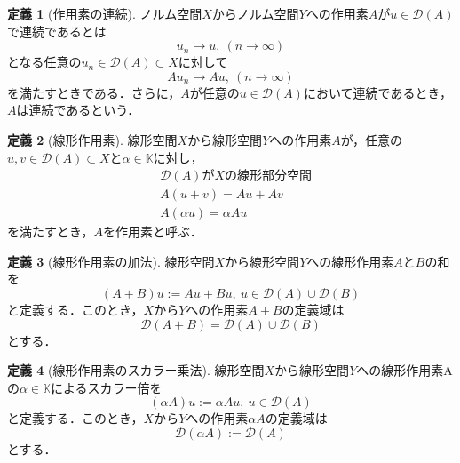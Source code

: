 \documentclass[11pt,a4paper,titlepage]{jsreport}
\theoremstyle{definition}
\newtheorem{dfn}{定義}
\begin{document}
\begin{dfn}[作用素の連続]
  ノルム空間$X$からノルム空間$Y$への作用素$A$が$u\in\mathcal{D}(A)$で連続であるとは
  \begin{equation*}
    u_n \rightarrow u, \ (n\rightarrow \infty)
  \end{equation*}
  となる任意の$u_n\in\mathcal{D}(A)\subset X$に対して
  \begin{equation*}
    Au_n\rightarrow Au, \ (n\rightarrow \infty)
  \end{equation*}
  を満たすときである．さらに，$A$が任意の$u\in\mathcal{D}(A)$において連続であるとき，$A$は連続であるという．
\end{dfn}

\begin{dfn}[線形作用素]
  線形空間$X$から線形空間$Y$への作用素$A$が，任意の$u,v\in\mathcal{D}(A)\subset X$と$\alpha\in\mathbb{K}$に対し，
  \begin{align*}
     & \mathcal{D}(A)がXの線形部分空間 \\
     & A(u+v)=Au+Av                    \\
     & A(\alpha u)=\alpha Au
  \end{align*}
  を満たすとき，$A$を作用素と呼ぶ．
\end{dfn}

\begin{dfn}[線形作用素の加法]
  \label{dfn:線形作用素の加法}
  線形空間$X$から線形空間$Y$への線形作用素$A$と$B$の和を
  \begin{equation*}
    (A+B)u := Au+Bu, \ u\in\mathcal{D}(A)\cup\mathcal{D}(B)
  \end{equation*}
  と定義する．このとき，$X$から$Y$への作用素$A+B$の定義域は
  \begin{equation*}
    \mathcal{D}(A+B) = \mathcal{D}(A)\cup\mathcal{D}(B)
  \end{equation*}
  とする．
\end{dfn}

\begin{dfn}[線形作用素のスカラー乗法]
  \label{dfn:線形作用素のスカラー乗法}
  線形空間$X$から線形空間$Y$への線形作用素Aの$\alpha\in\mathbb{K}$によるスカラー倍を
  \begin{equation*}
    (\alpha A)u := \alpha Au, \ u\in\mathcal{D}(A)
  \end{equation*}
  と定義する．このとき，$X$から$Y$への作用素$\alpha A$の定義域は
  \begin{equation*}
    \mathcal{D}(\alpha A):= \mathcal{D}(A)
  \end{equation*}
  とする．
\end{dfn}
\end{document}
